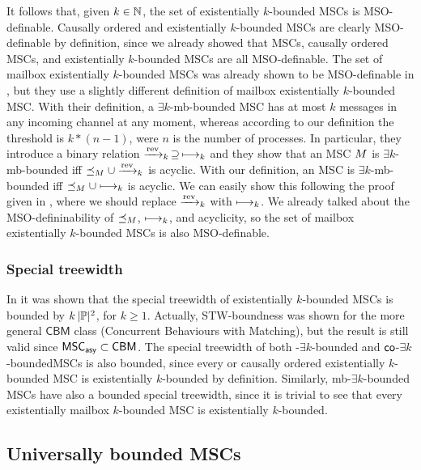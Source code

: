 \documentclass{article}
\begin{document}
It follows that, given $k \in \mathbb{N}$, the set of existentially $k$-bounded MSCs is MSO-definable. Causally ordered and \pp existentially $k$-bounded MSCs are clearly MSO-definable by definition, since we already showed that \pp MSCs, causally ordered MSCs, and existentially $k$-bounded MSCs are all MSO-definable. The set of mailbox existentially $k$-bounded MSCs was already shown to be MSO-definable in \cite{DBLP:conf/concur/BolligGFLLS21}, but they use a slightly different definition of mailbox existentially $k$-bounded MSC. With their definition, a $\exists k$-mb-bounded MSC has at most $k$ messages in any incoming channel at any moment, whereas according to our definition the threshold is $k*(n-1)$, were $n$ is the number of processes. In particular, they introduce a binary relation $\xrightarrow{\text{rev}}_k \,\supseteq\, \longmapsto_k$ and they show that an MSC $M$ is $\exists k$-mb-bounded iff $\preceq_M \cup \xrightarrow{\text{rev}}_k$ is acyclic. With our definition, an MSC is $\exists k$-mb-bounded iff $\preceq_M \cup \longmapsto_k$ is acyclic. We can easily show this following the proof given in \cite{DBLP:conf/concur/BolligGFLLS21}, where we should replace $\xrightarrow{\text{rev}}_k$ with $\longmapsto_k$. We already talked about the MSO-defininability of $\preceq_M$, $\longmapsto_k$, and acyclicity, so the set of mailbox existentially $k$-bounded MSCs is also MSO-definable.

\subsubsection{Special treewidth}

In \cite[Lemma 5.37]{DBLP:journals/corr/abs-1904-06942} it was shown that the special treewidth of existentially $k$-bounded MSCs is bounded by $k\,|\mathbb{P}|^2$, for $k \ge 1$. Actually, STW-boundness was shown for the more general $\mathsf{CBM}$ class (Concurrent Behaviours with Matching), but the result is still valid since $\mathsf{MSC}_{\mathsf{asy}} \subset \mathsf{CBM}$. The special treewidth of both \pp-$\exists k$-bounded and $\mathsf{co}$-$\exists k$-bounded\pp MSCs is also bounded, since every \pp or causally ordered existentially $k$-bounded MSC is existentially $k$-bounded by definition. Similarly, mb-$\exists k$-bounded MSCs have also a bounded special treewidth, since it is trivial to see that every existentially mailbox $k$-bounded MSC is existentially $k$-bounded.

\subsection{Universally bounded MSCs}
\end{document}
